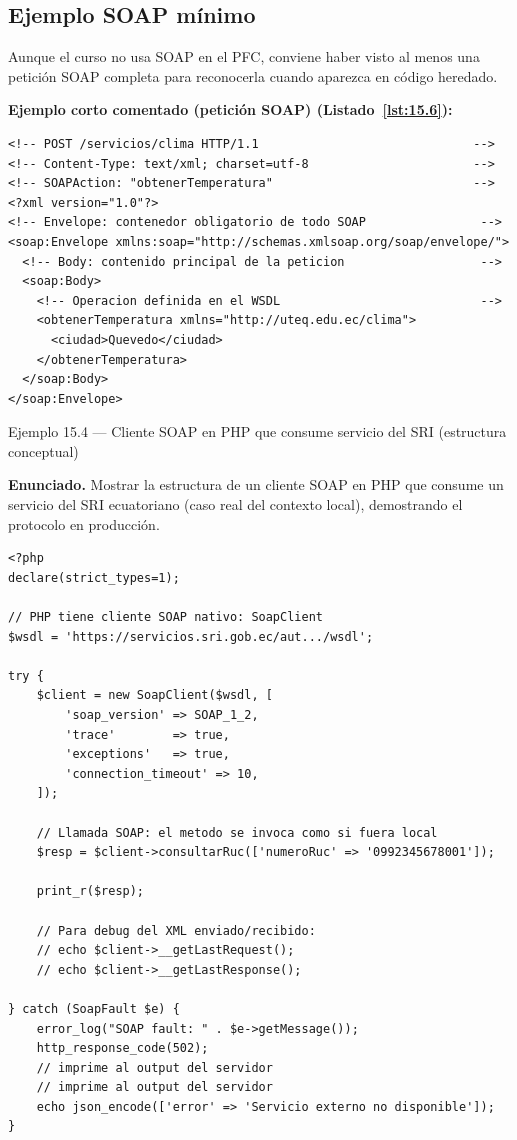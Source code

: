 \subsection{Ejemplo SOAP mínimo}

Aunque el curso no usa SOAP en el PFC, conviene haber visto
al menos una petición SOAP completa para reconocerla cuando aparezca
en código heredado.

\textbf{Ejemplo corto comentado (petición SOAP) (Listado~\ref{lst:15.6}):}
\begin{lstlisting}[language=HTML5,numbers=none,caption={Ejemplo de HTML},label=lst:15.6]
<!-- POST /servicios/clima HTTP/1.1                              -->
<!-- Content-Type: text/xml; charset=utf-8                       -->
<!-- SOAPAction: "obtenerTemperatura"                            -->
<?xml version="1.0"?>
<!-- Envelope: contenedor obligatorio de todo SOAP                -->
<soap:Envelope xmlns:soap="http://schemas.xmlsoap.org/soap/envelope/">
  <!-- Body: contenido principal de la peticion                   -->
  <soap:Body>
    <!-- Operacion definida en el WSDL                            -->
    <obtenerTemperatura xmlns="http://uteq.edu.ec/clima">
      <ciudad>Quevedo</ciudad>
    </obtenerTemperatura>
  </soap:Body>
</soap:Envelope>
\end{lstlisting}


\begin{cajaejemplo}{Ejemplo 15.4 --- Cliente SOAP en PHP que consume servicio del SRI (estructura conceptual)}

\textbf{Enunciado.} Mostrar la estructura de un cliente SOAP en PHP que consume un servicio del SRI ecuatoriano (caso real del contexto local), demostrando el protocolo en producción.

\begin{lstlisting}[style=php,caption={consultar-ruc.php},label=lst:15.7]
<?php
declare(strict_types=1);

// PHP tiene cliente SOAP nativo: SoapClient
$wsdl = 'https://servicios.sri.gob.ec/aut.../wsdl';

try {
    $client = new SoapClient($wsdl, [
        'soap_version' => SOAP_1_2,
        'trace'        => true,
        'exceptions'   => true,
        'connection_timeout' => 10,
    ]);

    // Llamada SOAP: el metodo se invoca como si fuera local
    $resp = $client->consultarRuc(['numeroRuc' => '0992345678001']);

    print_r($resp);

    // Para debug del XML enviado/recibido:
    // echo $client->__getLastRequest();
    // echo $client->__getLastResponse();

} catch (SoapFault $e) {
    error_log("SOAP fault: " . $e->getMessage());
    http_response_code(502);
    // imprime al output del servidor
    // imprime al output del servidor
    echo json_encode(['error' => 'Servicio externo no disponible']);
}
\end{lstlisting}
\end{cajaejemplo}

